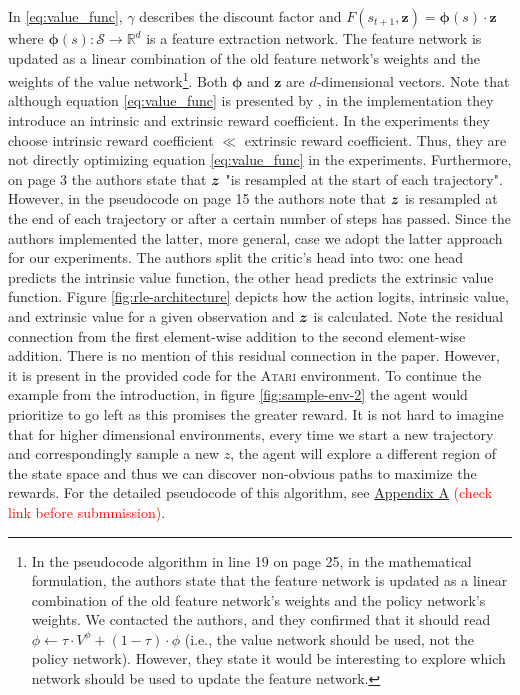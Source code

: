\documentclass[10pt]{article} %
\begin{document}
\noindent In \eqref{eq:value_func}, $\gamma$ describes the discount factor and $F(s_{t+1}, \textbf{z}) =  \boldsymbol{\phi}(s) \cdot \textbf{z}$ where $\boldsymbol{\phi}(s): \mathcal{S} \rightarrow \mathbb{R}^{d}$ is a feature extraction network. The feature network is updated as a linear combination of the old feature network's weights and the weights of the value network\footnote{In the pseudocode algorithm in line 19 on page 25, in the mathematical formulation, the authors state that the feature network is updated as a linear combination of the old feature network's weights and the policy network's weights. We contacted the authors, and they confirmed that it should read $\phi \leftarrow \tau \cdot V^\phi + (1 - \tau ) \cdot \phi$ (i.e., the value network should be used, not the policy network). However, they state it would be interesting to explore which network should be used to update the feature network.}. Both $\boldsymbol{\phi}$ and $\textbf{z}$ are $d$-dimensional vectors. Note that although equation \ref{eq:value_func} is presented by \cite{rle-paper}, in the implementation they introduce an intrinsic and extrinsic reward coefficient. In the experiments they choose intrinsic reward coefficient $\ll$ extrinsic reward coefficient. Thus, they are not directly optimizing equation \ref{eq:value_func} in the experiments. Furthermore, on page 3 the authors state that ${\bm{z}}$ "is resampled at the start of each trajectory". However, in the pseudocode on page 15 the authors note that ${\bm{z}}$ is resampled at the end of each trajectory or after a certain number of steps has passed. Since the authors implemented the latter, more general, case we adopt the latter approach for our experiments. The authors split the critic's head into two: one head predicts the intrinsic value function, the other head predicts the extrinsic value function. Figure \ref{fig:rle-architecture} depicts how the action logits, intrinsic value, and extrinsic value for a given observation and ${\bm{z}}$ is calculated. Note the residual connection from the first element-wise addition to the second element-wise addition. There is no mention of this residual connection in the paper. However, it is present in the provided code for the \textsc{Atari} environment. To continue the example from the introduction, in figure \ref{fig:sample-env-2} the agent would prioritize to go left as this promises the greater reward. It is not hard to imagine that for higher dimensional environments, every time we start a new trajectory and correspondingly sample a new $z$, the agent will explore a different region of the state space and thus we can discover non-obvious paths to maximize the rewards. For the detailed pseudocode of this algorithm, see \hyperlink{algo-rle}{Appendix A} \textcolor{red}{(check link before submmission)}.
\end{document}
